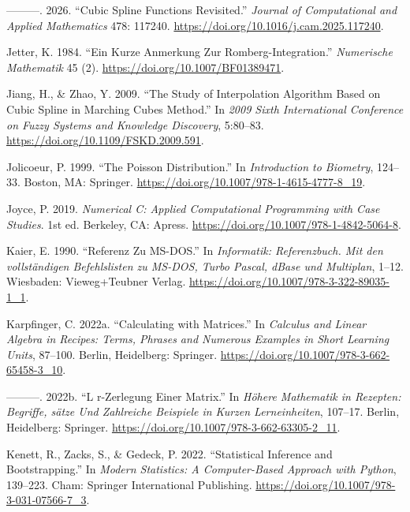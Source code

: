 \documentclass[
]{article}
\newlength{\cslhangindent}
\newlength{\cslentryspacingunit} %
\newenvironment{CSLReferences}[2] %
 {%
  \setlength{\parindent}{0pt}
  \ifodd #1
  \let\oldpar\par
  \def\par{\hangindent=\cslhangindent\oldpar}
  \fi
  \setlength{\parskip}{#2\cslentryspacingunit}
 }%
 {}
\begin{document}
\begin{CSLReferences}{1}{0}
\leavevmode{}%
---------. 2026. {``Cubic Spline Functions Revisited.''} \emph{Journal
of Computational and Applied Mathematics} 478: 117240.
\url{https://doi.org/10.1016/j.cam.2025.117240}.

\leavevmode{}%
Jetter, K. 1984. {``Ein Kurze Anmerkung Zur Romberg-Integration.''}
\emph{Numerische Mathematik} 45 (2).
\url{https://doi.org/10.1007/BF01389471}.

\leavevmode{}%
Jiang, H., \& Zhao, Y. 2009. {``The Study of Interpolation Algorithm
Based on Cubic Spline in Marching Cubes Method.''} In \emph{2009 Sixth
International Conference on Fuzzy Systems and Knowledge Discovery},
5:80--83. \url{https://doi.org/10.1109/FSKD.2009.591}.

\leavevmode{}%
Jolicoeur, P. 1999. {``The Poisson Distribution.''} In
\emph{Introduction to Biometry}, 124--33. Boston, MA: Springer.
\url{https://doi.org/10.1007/978-1-4615-4777-8_19}.

\leavevmode{}%
Joyce, P. 2019. \emph{{Numerical C: Applied Computational Programming
with Case Studies}}. 1st ed. Berkeley, CA: Apress.
\url{https://doi.org/10.1007/978-1-4842-5064-8}.

\leavevmode{}%
Kaier, E. 1990. {``Referenz Zu MS-DOS.''} In \emph{{Informatik:
Referenzbuch. Mit den vollständigen Befehlslisten zu MS-DOS, Turbo
Pascal, dBase und Multiplan}}, 1--12. Wiesbaden: Vieweg+Teubner Verlag.
\url{https://doi.org/10.1007/978-3-322-89035-1_1}.

\leavevmode{}%
Karpfinger, C. 2022a. {``Calculating with Matrices.''} In \emph{Calculus
and Linear Algebra in Recipes: Terms, Phrases and Numerous Examples in
Short Learning Units}, 87--100. Berlin, Heidelberg: Springer.
\url{https://doi.org/10.1007/978-3-662-65458-3_10}.

\leavevmode{}%
---------. 2022b. {``L r-Zerlegung Einer Matrix.''} In \emph{H{ö}here
Mathematik in Rezepten: Begriffe, s{ä}tze Und Zahlreiche Beispiele in
Kurzen Lerneinheiten}, 107--17. Berlin, Heidelberg: Springer.
\url{https://doi.org/10.1007/978-3-662-63305-2_11}.

\leavevmode{}%
Kenett, R., Zacks, S., \& Gedeck, P. 2022. {``Statistical Inference and
Bootstrapping.''} In \emph{Modern Statistics: A Computer-Based Approach
with Python}, 139--223. Cham: Springer International Publishing.
\url{https://doi.org/10.1007/978-3-031-07566-7_3}.


\end{CSLReferences}
\end{document}
